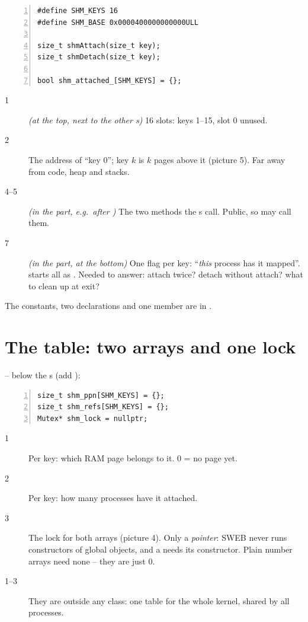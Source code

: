\documentclass[11pt]{report}
\newcommand{\done}[1]{\begin{keybox}[title={Done when}]#1\end{keybox}}
\begin{document}
\begin{lstlisting}[style=cpp,numbers=left,numberstyle=\tiny\color{headgray}]
#define SHM_KEYS 16
#define SHM_BASE 0x0000400000000000ULL

size_t shmAttach(size_t key);
size_t shmDetach(size_t key);

bool shm_attached_[SHM_KEYS] = {};
\end{lstlisting}
\begin{description}
  \item[1] \emph{(at the top, next to the other s)} 16 slots: keys 1--15, slot 0 unused.
  \item[2] The address of ``key 0''; key $k$ is $k$ pages above it (picture 5). Far away from code, heap and stacks.
  \item[4--5] \emph{(in the  part, e.g.\ after )} The two methods the s
        call. Public, so  may call them.
  \item[7] \emph{(in the  part, at the bottom)} One flag per key: ``\emph{this} process has it mapped''.
        \code{= \{\}} starts all as . Needed to answer: attach twice? detach without attach? what to
        clean up at exit?
\end{description}

\done{The constants, two declarations and one member are in \file{UserProcess.h}.}

\section{The table: two arrays and one lock}

\textbf{} -- below the s (add ):
\begin{lstlisting}[style=cpp,numbers=left,numberstyle=\tiny\color{headgray}]
size_t shm_ppn[SHM_KEYS] = {};
size_t shm_refs[SHM_KEYS] = {};
Mutex* shm_lock = nullptr;
\end{lstlisting}
\begin{description}
  \item[1] Per key: which RAM page belongs to it. 0 = no page yet.
  \item[2] Per key: how many processes have it attached.
  \item[3] The lock for both arrays (picture 4). Only a \emph{pointer}: SWEB never runs constructors of global
        objects, and a  needs its constructor. Plain number arrays need none -- they are just 0.
  \item[1--3] They are outside any class: one table for the whole kernel, shared by all processes.
\end{description}
\end{document}
